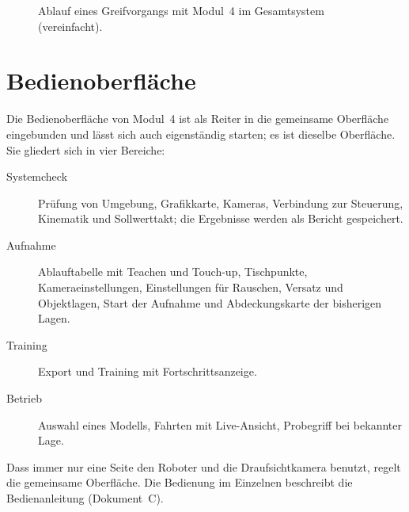 \begin{figure}[htbp]
  \centering
  \caption[Ablauf eines Greifvorgangs mit Modul~4]{Ablauf eines Greifvorgangs mit Modul~4
  im Gesamtsystem (vereinfacht).}
  \label{fig:grasper}
\end{figure}


\section{Bedienoberfläche}
\label{sec:gui}

Die Bedienoberfläche von Modul~4 ist als Reiter in die gemeinsame Oberfläche eingebunden und
lässt sich auch eigenständig starten; es ist dieselbe Oberfläche. Sie gliedert sich in vier
Bereiche:
\begin{description}
  \item[Systemcheck] Prüfung von Umgebung, Grafikkarte, Kameras, Verbindung zur Steuerung,
    Kinematik und Sollwerttakt; die Ergebnisse werden als Bericht gespeichert.
  \item[Aufnahme] Ablauftabelle mit Teachen und Touch-up, Tischpunkte, Kameraeinstellungen,
    Einstellungen für Rauschen, Versatz und Objektlagen, Start der Aufnahme und Abdeckungskarte
    der bisherigen Lagen.
  \item[Training] Export und Training mit Fortschrittsanzeige.
  \item[Betrieb] Auswahl eines Modells, Fahrten mit Live-Ansicht, Probegriff bei bekannter
    Lage.
\end{description}
Dass immer nur eine Seite den Roboter und die Draufsichtkamera benutzt, regelt die gemeinsame
Oberfläche. Die Bedienung im Einzelnen beschreibt die Bedienanleitung (Dokument~C).
